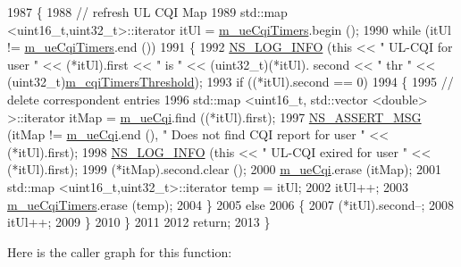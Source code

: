 \begin{DoxyCode}
1987 \{
1988   \textcolor{comment}{// refresh UL CQI  Map}
1989   std::map <uint16\_t,uint32\_t>::iterator itUl = \hyperlink{classns3_1_1TdBetFfMacScheduler_a89b7106fc5de30b9153316aa3ea2d368}{m\_ueCqiTimers}.begin ();
1990   \textcolor{keywordflow}{while} (itUl != \hyperlink{classns3_1_1TdBetFfMacScheduler_a89b7106fc5de30b9153316aa3ea2d368}{m\_ueCqiTimers}.end ())
1991     \{
1992       \hyperlink{group__logging_gafbd73ee2cf9f26b319f49086d8e860fb}{NS\_LOG\_INFO} (\textcolor{keyword}{this} << \textcolor{stringliteral}{" UL-CQI for user "} << (*itUl).first << \textcolor{stringliteral}{" is "} << (uint32\_t)(*itUl).
      second << \textcolor{stringliteral}{" thr "} << (uint32\_t)\hyperlink{classns3_1_1TdBetFfMacScheduler_ad423d7c181e089b37159502bad92bccd}{m\_cqiTimersThreshold});
1993       \textcolor{keywordflow}{if} ((*itUl).second == 0)
1994         \{
1995           \textcolor{comment}{// delete correspondent entries}
1996           std::map <uint16\_t, std::vector <double> >::iterator itMap = \hyperlink{classns3_1_1TdBetFfMacScheduler_a869067679aa0a846212a1fb509c1d702}{m\_ueCqi}.find ((*itUl).first);
1997           \hyperlink{assert_8h_aff5ece9066c74e681e74999856f08539}{NS\_ASSERT\_MSG} (itMap != \hyperlink{classns3_1_1TdBetFfMacScheduler_a869067679aa0a846212a1fb509c1d702}{m\_ueCqi}.end (), \textcolor{stringliteral}{" Does not find CQI report for user "}
       << (*itUl).first);
1998           \hyperlink{group__logging_gafbd73ee2cf9f26b319f49086d8e860fb}{NS\_LOG\_INFO} (\textcolor{keyword}{this} << \textcolor{stringliteral}{" UL-CQI exired for user "} << (*itUl).first);
1999           (*itMap).second.clear ();
2000           \hyperlink{classns3_1_1TdBetFfMacScheduler_a869067679aa0a846212a1fb509c1d702}{m\_ueCqi}.erase (itMap);
2001           std::map <uint16\_t,uint32\_t>::iterator temp = itUl;
2002           itUl++;
2003           \hyperlink{classns3_1_1TdBetFfMacScheduler_a89b7106fc5de30b9153316aa3ea2d368}{m\_ueCqiTimers}.erase (temp);
2004         \}
2005       \textcolor{keywordflow}{else}
2006         \{
2007           (*itUl).second--;
2008           itUl++;
2009         \}
2010     \}
2011 
2012   \textcolor{keywordflow}{return};
2013 \}
\end{DoxyCode}


Here is the caller graph for this function\+:


